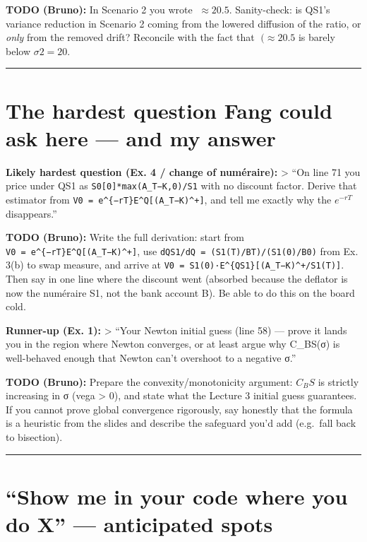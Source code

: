 \documentclass[
  11pt,
]{article}
\begin{document}
\textbf{TODO (Bruno):} In Scenario 2 you wrote \( ≈ 20.5%
\). Sanity-check: is QS1's variance reduction in Scenario 2 coming from
the lowered diffusion of the ratio, or \emph{only} from the removed
drift? Reconcile with the fact that \( (≈20.5%
\) is barely below \(σ2 = 20%
\).

\begin{center}\rule{0.5\linewidth}{0.5pt}\end{center}

\hypertarget{the-hardest-question-fang-could-ask-here-and-my-answer}{%
\section{The hardest question Fang could ask here --- and my
answer}\label{the-hardest-question-fang-could-ask-here-and-my-answer}}

\textbf{Likely hardest question (Ex. 4 / change of numéraire):}
\textgreater{} ``On line 71 you price under QS1 as
\texttt{S0{[}0{]}*max(A\_T−K,0)/S1} with no discount factor. Derive that
estimator from \texttt{V0\ =\ e\^{}\{−rT\}E\^{}Q{[}(A\_T−K)\^{}+{]}},
and tell me exactly why the \(e^{−rT}\) disappears.''

\textbf{TODO (Bruno):} Write the full derivation: start from
\texttt{V0\ =\ e\^{}\{−rT\}E\^{}Q{[}(A\_T−K)\^{}+{]}}, use
\texttt{dQS1/dQ\ =\ (S1(T)/BT)/(S1(0)/B0)} from Ex. 3(b) to swap
measure, and arrive at
\texttt{V0\ =\ S1(0)·E\^{}\{QS1\}{[}(A\_T−K)\^{}+/S1(T){]}}. Then say in
one line where the discount went (absorbed because the deflator is now
the numéraire S1, not the bank account B). Be able to do this on the
board cold.

\textbf{Runner-up (Ex. 1):} \textgreater{} ``Your Newton initial guess
(line 58) --- prove it lands you in the region where Newton converges,
or at least argue why C\_BS(σ) is well-behaved enough that Newton can't
overshoot to a negative σ.''

\textbf{TODO (Bruno):} Prepare the convexity/monotonicity argument:
\(C_BS\) is strictly increasing in σ (vega \textgreater{} 0), and state
what the Lecture 3 initial guess guarantees. If you cannot prove global
convergence rigorously, say honestly that the formula is a heuristic
from the slides and describe the safeguard you'd add (e.g.~fall back to
bisection).

\begin{center}\rule{0.5\linewidth}{0.5pt}\end{center}

\hypertarget{show-me-in-your-code-where-you-do-x-anticipated-spots}{%
\section{``Show me in your code where you do X'' --- anticipated
spots}\label{show-me-in-your-code-where-you-do-x-anticipated-spots}}
\end{document}
